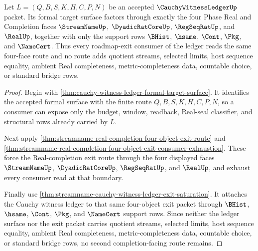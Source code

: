 \begin{theorem}
\label{thm:cauchy-witness-ledger-four-face-real-completion-lock}
Let $L=(Q,B,S,K,H,C,P,N)$ be an accepted $\CauchyWitnessLedgerUp$ packet. Its formal target surface factors through exactly the four Phase Real and Completion faces $\StreamNameUp$, $\DyadicRatCoreUp$, $\RegSeqRatUp$, and $\RealUp$, together with only the support rows $\BHist$, $\hsame$, $\Cont$, $\Pkg$, and $\NameCert$. Thus every roadmap-exit consumer of the ledger reads the same four-face route and no route adds quotient streams, selected limits, host sequence equality, ambient Real completeness, metric-completeness data, countable choice, or standard bridge rows.
\end{theorem}
\begin{proof}
Begin with \autoref{thm:cauchy-witness-ledger-formal-target-surface}. It identifies the accepted formal surface with the finite route $Q,B,S,K,H,C,P,N$, so a consumer can expose only the budget, window, readback, Real-seal classifier, and structural rows already carried by $L$.

Next apply \autoref{thm:streamname-real-completion-four-object-exit-route} and \autoref{thm:streamname-real-completion-four-object-exit-consumer-exhaustion}. These force the Real-completion exit route through the four displayed faces $\StreamNameUp$, $\DyadicRatCoreUp$, $\RegSeqRatUp$, and $\RealUp$, and exhaust every consumer read at that boundary.

Finally use \autoref{thm:streamname-cauchy-witness-ledger-exit-saturation}. It attaches the Cauchy witness ledger to that same four-object exit packet through $\BHist$, $\hsame$, $\Cont$, $\Pkg$, and $\NameCert$ support rows. Since neither the ledger surface nor the exit packet carries quotient streams, selected limits, host sequence equality, ambient Real completeness, metric-completeness data, countable choice, or standard bridge rows, no second completion-facing route remains.
\end{proof}

